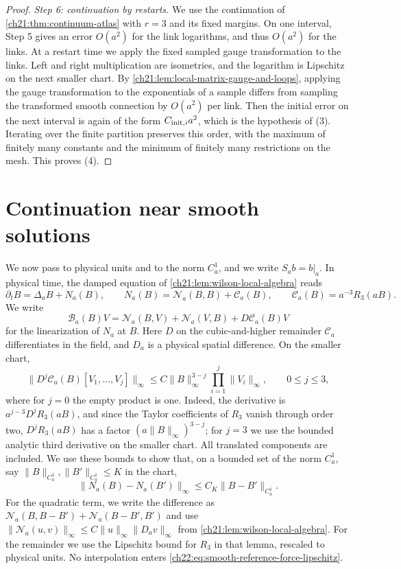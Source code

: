 \begin{proof}
\emph{Step 6: continuation by restarts.} We use the continuation of \cref{ch21:thm:continuum-atlas} with $r=3$ and its fixed margins. On one interval, Step 5 gives an error $O(a^2)$ for the link logarithms, and thus $O(a^2)$ for the links. At a restart time we apply the fixed sampled gauge transformation to the links. Left and right multiplication are isometries, and the logarithm is Lipschitz on the next smaller chart. By \cref{ch21:lem:local-matrix-gauge-and-loops}, applying the gauge transformation to the exponentials of a sample differs from sampling the transformed smooth connection by $O(a^2)$ per link. Then the initial error on the next interval is again of the form $C_{{\rm init},i}a^2$, which is the hypothesis of (3). Iterating over the finite partition preserves this order, with the maximum of finitely many constants and the minimum of finitely many restrictions on the mesh. This proves (4).
\end{proof}

\section{Continuation near smooth solutions}\label{ch22:sec:reference}

We now pass to physical units and to the norm $C^1_a$, and we write $S_ab=b|_a$. In physical time, the damped equation of \cref{ch21:lem:wilson-local-algebra} reads
\[
 \partial_tB=\Delta_aB+N_a(B),\qquad
 N_a(B)=\mathcal N_a(B,B)+\mathscr C_a(B),\qquad
 \mathscr C_a(B)=a^{-3}R_3(aB).
\]
We write
\[
 \mathscr B_a(B)V=\mathcal N_a(B,V)+\mathcal N_a(V,B)+D\mathscr C_a(B)V
\]
for the linearization of $N_a$ at $B$. Here $D$ on the cubic-and-higher remainder $\mathscr C_a$ differentiates in the field, and $D_a$ is a physical spatial difference. On the smaller chart,
\begin{equation}\label{ch22:eq:cubic-variation-bounds}
 \|D^j\mathscr C_a(B)[V_1,\ldots,V_j]\|_\infty\le C\|B\|_\infty^{3-j}\prod_{i=1}^j\|V_i\|_\infty,\qquad 0\le j\le3,
\end{equation}
where for $j=0$ the empty product is one. Indeed, the derivative is $a^{j-3}D^jR_3(aB)$, and since the Taylor coefficients of $R_3$ vanish through order two, $D^jR_3(aB)$ has a factor $(a\|B\|_\infty)^{3-j}$; for $j=3$ we use the bounded analytic third derivative on the smaller chart. All translated components are included. We use these bounds to show that, on a bounded set of the norm $C^1_a$, say $\|B\|_{C^1_a},\|B'\|_{C^1_a}\le K$ in the chart,
\begin{equation}\label{ch22:eq:smooth-reference-force-lipschitz}
 \|N_a(B)-N_a(B')\|_\infty\le C_K\|B-B'\|_{C_a^1}.
\end{equation}
For the quadratic term, we write the difference as $\mathcal N_a(B,B-B')+\mathcal N_a(B-B',B')$ and use $\|\mathcal N_a(u,v)\|_\infty\le C\|u\|_\infty\|D_av\|_\infty$ from \cref{ch21:lem:wilson-local-algebra}. For the remainder we use the Lipschitz bound for $R_3$ in that lemma, rescaled to physical units. No interpolation enters \eqref{ch22:eq:smooth-reference-force-lipschitz}.

